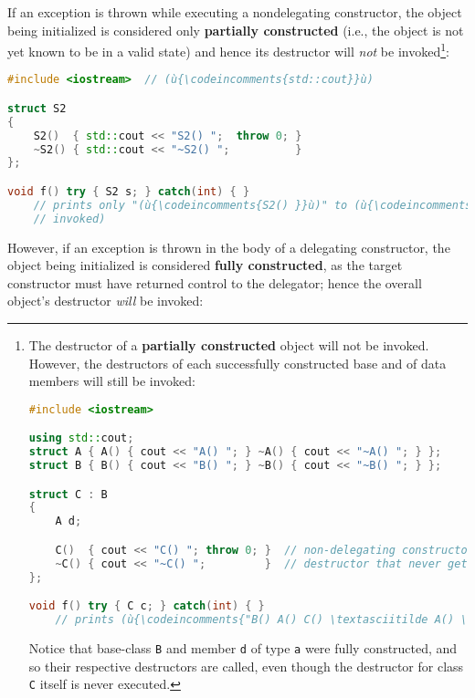 \noindent If an exception is thrown while executing a nondelegating constructor,
the object being initialized is considered only \textbf{partially
constructed} (i.e., the object is not yet known to be in a valid state)
and hence its destructor will \emph{not} be
invoked{\cprotect\footnote{The destructor of a \textbf{partially
constructed} object will not be invoked. However, the destructors of
each successfully constructed base and of data members will still be
invoked:

\begin{lstlisting}[language=C++, basicstyle={\ttfamily\footnotesize}]
#include <iostream>

using std::cout;
struct A { A() { cout << "A() "; } ~A() { cout << "~A() "; } };
struct B { B() { cout << "B() "; } ~B() { cout << "~B() "; } };

struct C : B
{
    A d;

    C()  { cout << "C() "; throw 0; }  // non-delegating constructor that throws
    ~C() { cout << "~C() ";         }  // destructor that never gets called
};

void f() try { C c; } catch(int) { }
    // prints (ù{\codeincomments{"B() A() C() \textasciitilde A() \textasciitilde B()"}}ù) to (ù{\codeincomments{stdout}}ù)
\end{lstlisting}
    
\noindent Notice that base-class \texttt{B} and member \texttt{d} of type
\texttt{a} were fully constructed, and so their respective destructors
are called, even though the destructor for class \texttt{C} itself is
  never executed.}}:

\begin{lstlisting}[language=C++]
#include <iostream>  // (ù{\codeincomments{std::cout}}ù)

struct S2
{
    S2()  { std::cout << "S2() ";  throw 0; }
    ~S2() { std::cout << "~S2() ";          }
};

void f() try { S2 s; } catch(int) { }
    // prints only "(ù{\codeincomments{S2() }}ù)" to (ù{\codeincomments{stdout}}ù) (i.e., the destructor of (ù{\codeincomments{S2}}ù) is never
    // invoked)
\end{lstlisting}
    
\noindent However, if an exception is thrown in the body of a delegating
constructor, the object being initialized is considered \textbf{fully
constructed}, as the target constructor must have returned control to
the delegator; hence the overall object's destructor \emph{will} be
invoked:

